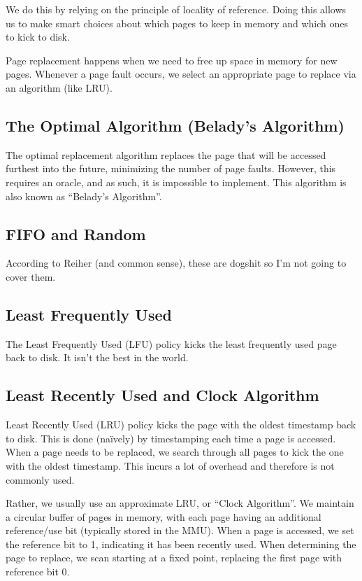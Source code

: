 \documentclass{report}
\begin{document}
We do this by relying on the principle of locality of reference. Doing this allows us to make smart
choices about which pages to keep in memory and which ones to kick to disk.

Page replacement happens when we need to free up space in memory for new pages. Whenever a page
fault occurs, we select an appropriate page to replace via an algorithm (like LRU).

\subsection{The Optimal Algorithm (Belady's Algorithm)}
The optimal replacement algorithm replaces the page that will be accessed furthest into the future,
minimizing the number of page faults. However, this requires an oracle, and as such, it is
impossible to implement. This algorithm is also known as ``Belady's Algorithm''.


\subsection{FIFO and Random}
According to Reiher (and common sense), these are dogshit so I'm not going to cover them.

\subsection{Least Frequently Used}
The Least Frequently Used (LFU) policy kicks the least frequently used page back to disk. It isn't
the best in the world.

\subsection{Least Recently Used and Clock Algorithm}
Least Recently Used (LRU) policy kicks the page with the oldest timestamp back to disk. This is done
(naïvely) by timestamping each time a page is accessed. When a page needs to be replaced, we search
through all pages to kick the one with the oldest timestamp. This incurs a lot of overhead and
therefore is not commonly used.

Rather, we usually use an approximate LRU, or ``Clock Algorithm''. We maintain a circular buffer of
pages in memory, with each page having an additional reference/use bit (typically stored in the
MMU). When a page is accessed, we set the reference bit to 1, indicating it has been recently
used. When determining the page to replace, we scan starting at a fixed point, replacing the first
page with reference bit 0.
\end{document}

